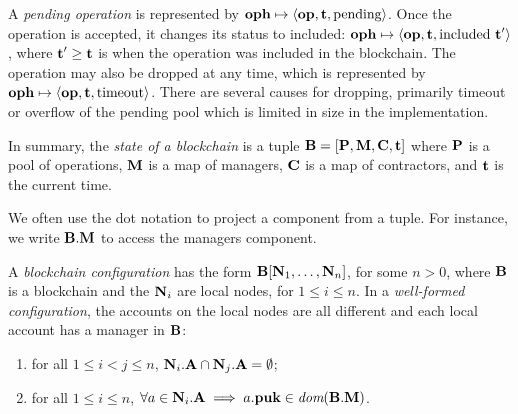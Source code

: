 \documentclass[a4paper]{llncs}
\begin{document}
A \emph{pending operation} is represented by
$\textbf{oph} \mapsto \langle  \textbf{op}, \textbf{t}, \text{pending}\rangle $.
Once the operation is accepted, it changes its status to included:
$\textbf{oph} \mapsto \langle  \textbf{op}, \textbf{t}, \text{included}\ \textbf{t}'\rangle $, where
$\textbf{t}' \ge \textbf{t}$ is  when the operation was included in the
blockchain.  The operation may also be dropped at any time, which is
represented by
$\textbf{oph} \mapsto \langle  \textbf{op}, \textbf{t}, \text{timeout}\rangle $. There are several
causes for dropping, primarily timeout or overflow of the pending
pool which is limited in size in the implementation.




In summary, the \emph{state of a blockchain} is a tuple
$\textbf{B} = [\textbf{P}, \textbf{M}, \textbf{C}, \textbf{t}]$ where
$\textbf{P}$ is a pool of operations, $\textbf{M}$ is a map of managers,
$\textbf{C}$ is a map of contractors, and $\textbf{t}$ is the current
time. 

We often use the dot notation to project a component from a tuple. For
instance, we write $\textbf{B}.\textbf{M}$ to access the managers
component. 

A \emph{blockchain configuration} has the form
$\textbf{B}[ \textbf{N}_1, \dots, \textbf{N}_n]$, for some $n>0$, where $\textbf{B}$ is a
blockchain and the $\textbf{N}_i$ are local nodes, for $1\le i\le n$.
In a \emph{well-formed configuration}, the accounts on the local nodes are all different and each
local account has a manager in $\textbf{B}$:
\begin{enumerate}
\item for all $1\le i< j\le n$, $\textbf{N}_i.\textbf{A} \cap
  \textbf{N}_j.\textbf{A} = \emptyset$;
\item for all $1\le i \le n$, 
    $\forall a \in \textbf{N}_i.\textbf{A} \implies a.\textbf{puk} \in \textit{dom}( \textbf{B}.\textbf{M})$.
\end{enumerate}
\end{document}
